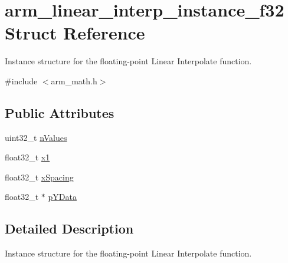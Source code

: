 \hypertarget{structarm__linear__interp__instance__f32}{\section{arm\-\_\-linear\-\_\-interp\-\_\-instance\-\_\-f32 Struct Reference}
\label{structarm__linear__interp__instance__f32}
}


Instance structure for the floating-\/point Linear Interpolate function.  




{\ttfamily \#include $<$arm\-\_\-math.\-h$>$}

\subsection*{Public Attributes}
\begin{DoxyCompactItemize}
\item 
uint32\-\_\-t \hyperlink{structarm__linear__interp__instance__f32_a95f02a926b16d35359aca5b31e813b11}{n\-Values}
\item 
float32\-\_\-t \hyperlink{structarm__linear__interp__instance__f32_a08352dc6ea82fbc0827408e018535481}{x1}
\item 
float32\-\_\-t \hyperlink{structarm__linear__interp__instance__f32_aa8e2d686b5434a406d390b347b183511}{x\-Spacing}
\item 
float32\-\_\-t $\ast$ \hyperlink{structarm__linear__interp__instance__f32_ab373001f6afad0850359c344a4d7eee4}{p\-Y\-Data}
\end{DoxyCompactItemize}


\subsection{Detailed Description}
Instance structure for the floating-\/point Linear Interpolate function. 

